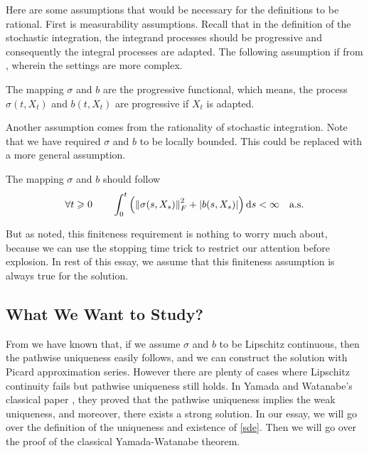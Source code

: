 \documentclass[8pt,onesided]{article}
\begin{document}
\begin{remark}
     Here are some assumptions that would be necessary for the definitions to be rational. First is measurability assumptions. Recall that in the definition of the stochastic integration, the integrand processes should be progressive and consequently the integral processes are adapted. The following assumption if from \cite{rogers2000diffusions2}, wherein the settings are more complex.
    \begin{ass}
         The mapping $\sigma$ and $b$ are the progressive functional, which means, the process $\sigma(t,X_t)$ and $b(t,X_t)$ are progressive if $X_t$ is adapted.
    \end{ass}
    Another assumption comes from the rationality of stochastic integration. Note that we have required $\sigma$ and $b$ to be locally bounded. This could be replaced with a more general assumption. 
    \begin{ass}
    [Finiteness] \label{fin} The mapping $\sigma$ and $b$ should follow
    \begin{equation*}
        \forall t\geqslant 0 \qquad\int_0^t \left(\left\lVert\sigma(s,X_s)\right\rVert_{F}^2 + |b(s,X_s)| \right)\dd s<\infty\quad \text{a.s.}
    \end{equation*}
    \end{ass}
    But as \cite{rogers2000diffusions2} noted, this finiteness requirement is nothing to worry much about, because we can use the stopping time trick to restrict our attention before explosion. In rest of this essay, we assume that this finiteness assumption is always true for the solution. 
\end{remark}

\subsection{What We Want to Study?}

From \cite{gall2016brownian} we have known that, if we assume $\sigma$ and $b$ to be Lipschitz continuous, then the pathwise uniqueness easily follows, and we can construct the solution with Picard approximation series. However there are plenty of cases where Lipschitz continuity fails but pathwise uniqueness still holds. In Yamada and Watanabe's classical paper \cite{yamada1971}, they proved that the pathwise uniqueness implies the weak uniqueness, and moreover, there exists a strong solution. In our essay, we will go over the definition of the uniqueness and existence of \ref{sde}. Then we will go over the proof of the classical Yamada-Watanabe theorem.
\end{document}
